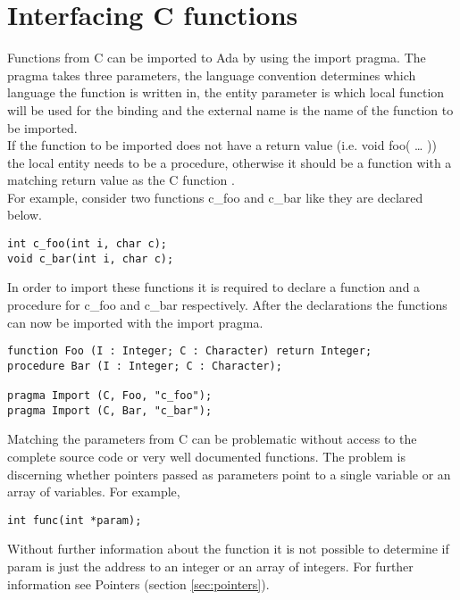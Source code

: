 \section{Interfacing C functions}\label{sec:cfunc}
Functions from C can be imported to Ada by using the import pragma. The pragma takes three parameters, the language convention determines which language the function is written in, the entity parameter is which local function will be used for the binding and the external name is the name of the function to be imported.\\
If the function to be imported does not have a return value (i.e. void foo( … )) the local entity needs to be a procedure, otherwise it should be a function with a matching return value as the C function \cite{taft2006adabasic}.\\
For example, consider two functions c_foo and c_bar like they are declared below.
\begin{lstlisting}
int c_foo(int i, char c);
void c_bar(int i, char c);
\end{lstlisting}
In order to import these functions it is required to declare a function and a procedure for c_foo and c_bar respectively. After the declarations the functions can now be imported with the import pragma.
\begin{lstlisting}
function Foo (I : Integer; C : Character) return Integer;
procedure Bar (I : Integer; C : Character);

pragma Import (C, Foo, "c_foo");
pragma Import (C, Bar, "c_bar");
\end{lstlisting}
Matching the parameters from C can be problematic without access to the complete source code or very well documented functions. The problem is discerning whether pointers passed as parameters point to a single variable or an array of variables. For example,
\begin{lstlisting}
int func(int *param);
\end{lstlisting}
Without further information about the function it is not possible to determine if param is just the address to an integer or an array of integers. For further information see Pointers (section \ref{sec:pointers}).
